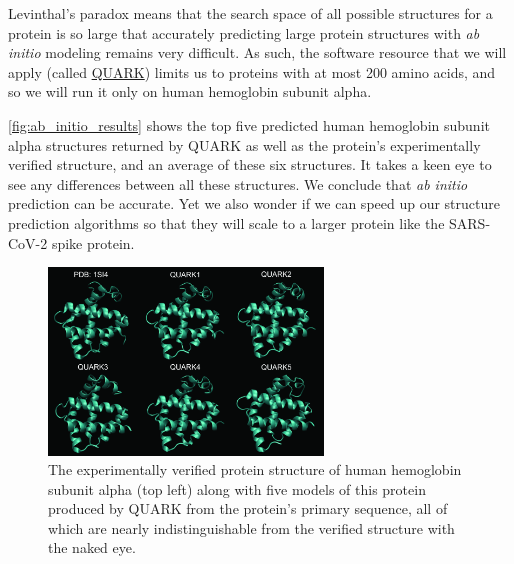 Levinthal's paradox means that the search space of all possible structures for a protein is so large that accurately predicting large protein structures with \textit{ab initio} modeling remains very difficult. As such, the software resource that we will apply (called \href{https://zhanglab.ccmb.med.umich.edu/QUARK/}{QUARK}) limits us to proteins with at most 200 amino acids, and so we will run it only on human hemoglobin subunit alpha.

\autoref{fig:ab_initio_results} shows the top five predicted human hemoglobin subunit alpha structures returned by QUARK as well as the protein's experimentally verified structure, and an average of these six structures. It takes a keen eye to see any differences between all these structures. We conclude that \textit{ab initio} prediction can be accurate. Yet we also wonder if we can speed up our structure prediction algorithms so that they will scale to a larger protein like the SARS-CoV-2 spike protein.\\

\begin{figure}[h]
	\centering
	\mySfFamily
	\includegraphics[width = 0.65\textwidth]{../images_CMYK/ab_initio_results}
	\caption{The experimentally verified protein structure of human hemoglobin subunit alpha (top left) along with five models of this protein produced by QUARK from the protein's primary sequence, all of which are nearly indistinguishable from the verified structure with the naked eye.}
	\label{fig:ab_initio_results}
\end{figure}


\FloatBarrier
{}

